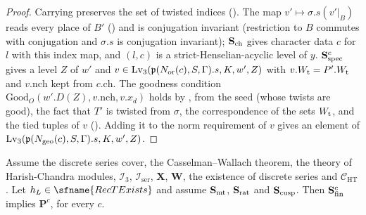 \begin{proof}
Carrying preserves the set of twisted indices (). The map
$v'\mapsto\sigma.s(v'|_B)$ reads every place of $B'$
() and is conjugation invariant (restriction to $B$ commutes with
conjugation and $\sigma.s$ is conjugation invariant); $\mathbf{S}_{\mathrm{ch}}$ gives character data $c$ for $l$
with this index map, and $(l,c)$ is a strict-Henselian-acyclic level of $y$. $\mathbf{S}_{\mathrm{spec}}^{c}$ gives a
level $Z$ of $w'$ and $v\in\mathrm{Lv}_3(\mathfrak{p}(N_{\mathrm{or}}(c),S,\Gamma).s,K,w',Z)$ with $v.W_{\mathrm{t}}=P'.W_{\mathrm{t}}$ and
$v.\mathrm{nch}$ kept from $c.\mathrm{ch}$. The goodness condition $\mathrm{Good}_O(w'.D(Z),v.\mathrm{nch},v.x_d)$ holds
by , from the seed (whose twists are good), the
fact that $T'$ is twisted from $\sigma$, the correspondence of the sets $W_{\mathrm{t}}$, and the tied tuples of
$v$ (). Adding it to the norm requirement of $v$ gives
an element of $\mathrm{Lv}_3(\mathfrak{p}(N_{\mathrm{geo}}(c),S,\Gamma).s,K,w',Z)$.
\end{proof}

\begin{theorem}\label{pf:baselat2:secondno}
Assume the discrete series cover, the Casselman--Wallach theorem, the theory of Harish-Chandra modules,
$\mathcal{I}_3$, $\mathcal{I}_{\mathrm{ser}}$, $\mathbf{X}$, $\mathbf{W}$,
the existence of discrete series and $\mathcal{C}_{\mathrm{HT}}$. Let $h_L\in\sfname{RecTExists}$ and assume $\mathbf{S}_{\mathrm{mt}}$,
$\mathbf{S}_{\mathrm{rat}}$ and $\mathbf{S}_{\mathrm{cusp}}$. Then $\mathbf{S}_{\mathrm{fin}}^{c}$ implies $\mathbf{P}^{c}$, for every $c$.
\end{theorem}

